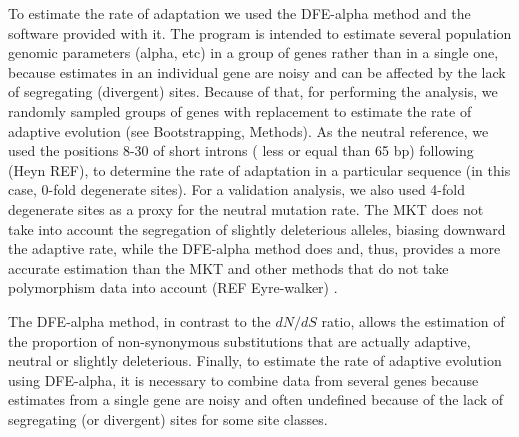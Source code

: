 To estimate the rate of adaptation we used the DFE-alpha method and the software provided with it. The program is intended to estimate several population genomic parameters (alpha, etc) in a group of genes rather than in a single one, because estimates in an individual gene are noisy and can be affected by the lack of segregating (divergent) sites. 
Because of that, for performing the analysis, we randomly sampled groups of genes with replacement to estimate the rate of adaptive evolution (see Bootstrapping, Methods).
As the neutral reference, we used the positions 8-30 of short introns ( less or equal than 65 bp) following (Heyn REF), to determine the rate of adaptation in a particular sequence (in this case, 0-fold degenerate sites). For a validation analysis, we also used 4-fold degenerate sites as a proxy for the neutral mutation rate.
The MKT does not take into account the segregation of slightly deleterious alleles, biasing downward the adaptive rate, while the DFE-alpha method does and, thus, provides a more accurate estimation than the MKT and other methods that do not take polymorphism data into account (REF Eyre-walker) .

The DFE-alpha method, in contrast to the $dN/dS$ ratio, allows the estimation of the proportion of non-synonymous substitutions that are actually adaptive, neutral or slightly deleterious. Finally, to estimate the rate of adaptive evolution using DFE-alpha, it is necessary to combine data from several genes because estimates from a single gene are noisy and often undefined because of the lack of segregating (or divergent) sites for some site classes.